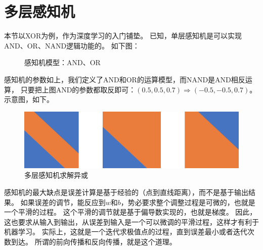 \section{多层感知机}
本节以XOR为例，作为深度学习的入门铺垫。
已知，单层感知机是可以实现AND、OR、NAND逻辑功能的。
如下图：


\begin{figure}[!htb] \centering 
	\caption{感知机模型：AND、OR}
\end{figure}

\noindent
感知机的参数如上，我们定义了AND和OR的运算模型，而NAND是AND相反运算，
只要把上图AND的参数都取反即可：$(0.5, 0.5, 0.7) \Rightarrow (-0.5, -0.5, 0.7)$。
示意图，如下。
\begin{figure}[!htb]
	\centerline{\includegraphics[width=.25\figwidth]{images/xor_or_nand.png}}
	\label{fig:part2_xor_or_nand}
	\caption{多层感知机求解异或}
\end{figure}

\noindent
感知机的最大缺点是误差计算是基于经验的（点到直线距离），而不是基于输出结果。
如果误差的调节，能反应到$w$和$b$，势必要求整个调整过程是可微的，也就是一个平滑的过程。
这个平滑的调节就是基于偏导数实现的，也就是梯度。
因此，这也要求从输入到输出，从误差到输入是一个可以微调的平滑过程，这样才有利于机器学习。
实际上，这就是一个迭代求极值点的过程，直到误差最小或者迭代次数到达。
所谓的前向传播和反向传播，就是这个道理。



